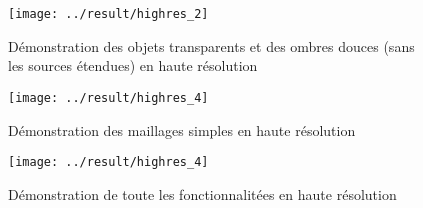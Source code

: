 \documentclass[12pt]{article}
\begin{document}
\begin{figure}[ht]
  \centering
  \texttt{[image: ../result/highres\_2]}
  \caption{Démonstration des objets transparents et des ombres douces (sans les sources étendues) en haute résolution}\label{fig:highres_2}
\end{figure}

\begin{figure}[ht]
  \centering
  \texttt{[image: ../result/highres\_4]}
  \caption{Démonstration des maillages simples en haute résolution}\label{fig:highres_4}
\end{figure}

\begin{figure}[ht]
  \centering
  \texttt{[image: ../result/highres\_4]}
  \caption{Démonstration de toute les fonctionnalitées en haute résolution}\label{fig:highres_5}
\end{figure}
\end{document}
